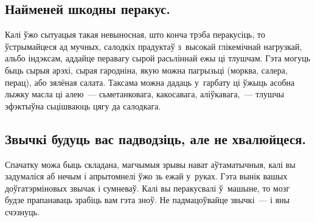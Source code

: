 \subsection{Найменей шкодны перакус.}
Калі ўжо сытуацыя такая невыносная, што конча трэба перакусіць, то ўстрымайцеся ад мучных, салодкіх прадуктаў з~высокай глікемічнай нагрузкай, альбо індэксам, аддайце перавагу сырой расьліннай ежы ці тлушчам. Гэта могуць быць сырыя арэхі, сырая гародніна, якую можна пагрызьці (морква, салера, перац), або зялёная салата. Таксама можна дадаць у~гарбату ці ўжыць асобна лыжку масла ці алею~--- сьметанковага, какосавага, аліўкавага,~--- тлушчы эфэктыўна сьцішваюць цягу да салодкага.

\subsection{Звычкі будуць вас падводзіць, але не хвалюйцеся.}
Спачатку можа быць складана, магчымыя зрывы нават аўтаматычныя, калі вы задумаліся аб нечым і апрытомнелі ўжо зь ежай у~руках. Гэта вынік вашых доўгатэрміновых звычак і сумневаў. Калі вы перакусвалі ў~машыне, то мозг будзе прапанаваць зрабіць вам гэта зноў. Не падмацоўвайце звычкі~--- і яны счэзнуць.
